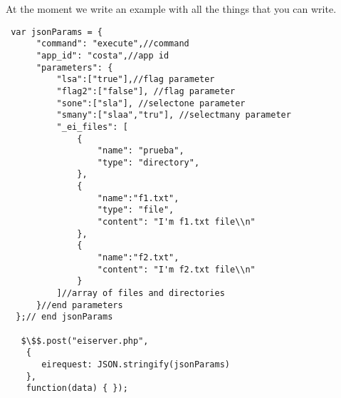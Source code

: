 At the moment we write an example with
 all the things that you can write.

\begin{lstlisting}
 var jsonParams = {
      "command": "execute",//command
      "app_id": "costa",//app id
      "parameters": {
          "lsa":["true"],//flag parameter
          "flag2":["false"], //flag parameter
          "sone":["sla"], //selectone parameter
          "smany":["slaa","tru"], //selectmany parameter
          "_ei_files": [
              {
                  "name": "prueba",
                  "type": "directory",
              },
              {
                  "name":"f1.txt",
                  "type": "file",
                  "content": "I'm f1.txt file\\n"
              },
              {
                  "name":"f2.txt",
                  "content": "I'm f2.txt file\\n"
              }
          ]//array of files and directories
      }//end parameters
  };// end jsonParams

   $\$$.post("eiserver.php",
    {
       eirequest: JSON.stringify(jsonParams)
    },
    function(data) { });
\end{lstlisting}


